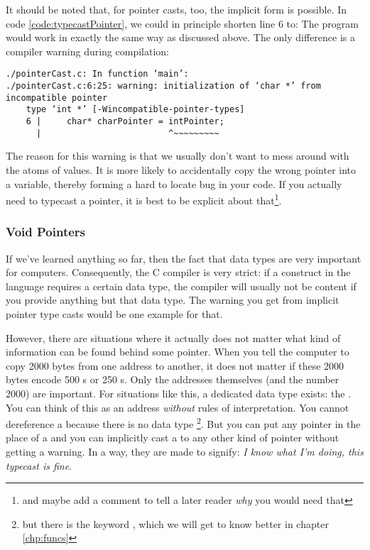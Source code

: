 {It should be noted that, for pointer casts, too, the implicit form is possible. In code \ref{code:typecastPointer}, we could in principle shorten line 6 to:
The program would work in exactly the same way as discussed above. The only difference is a compiler warning during compilation:
\begin{cmdbox}
\begin{verbatim}
./pointerCast.c: In function ‘main’:
./pointerCast.c:6:25: warning: initialization of ‘char *’ from incompatible pointer 
    type ‘int *’ [-Wincompatible-pointer-types]
    6 |     char* charPointer = intPointer;
      |                         ^~~~~~~~~~
\end{verbatim}
\end{cmdbox}

The reason for this warning is that we usually don't want to mess around with the atoms of values. It is more likely to accidentally copy the wrong pointer into a variable, thereby forming a hard to locate bug in your code. If you actually need to typecast a pointer, it is best to be explicit about that\footnote{and maybe add a comment to tell a later reader \emph{why} you would need that}.

\subsubsection{Void Pointers}
If we've learned anything so far, then the fact that data types are very important for computers. Consequently, the C compiler is very strict: if a construct in the language requires a certain data type, the compiler will usually not be content if you provide anything but that data type. The warning you get from implicit pointer type casts would be one example for that.

However, there are situations where it actually does not matter what kind of information can be found behind some pointer. When you tell the computer to copy 2000 bytes from one address to another, it does not matter if these 2000 bytes encode 500 s or 250 s. Only the addresses themselves (and the number 2000) are important. For situations like this, a dedicated data type exists: the . You can think of this as an address \emph{without} rules of interpretation. You cannot dereference a  because there is no data type \footnote{but there is the keyword , which we will get to know better in chapter \ref{chp:funcs}}. But you can put any pointer in the place of a  and you can implicitly cast a  to any other kind of pointer without getting a warning. In a way, they are made to signify: \emph{I know what I'm doing, this typecast is fine}.

}
